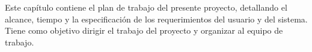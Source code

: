 %

Este capítulo contiene el plan de trabajo del presente proyecto, detallando el 
alcance, tiempo y la especificación de los requerimientos del usuario y del 
sistema. Tiene como objetivo dirigir el trabajo del proyecto y organizar al 
equipo de trabajo.

